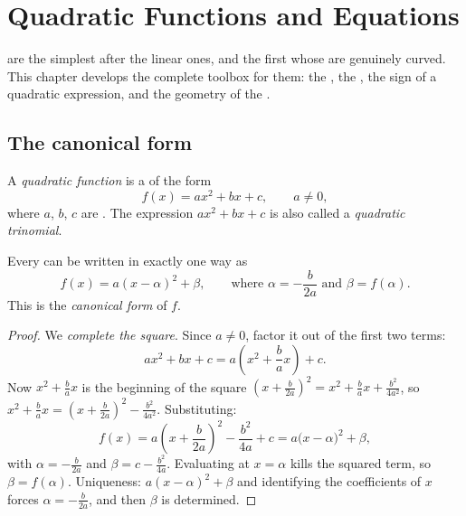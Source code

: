 \chapter{Quadratic Functions and Equations}\label{ch:g11:quad}

 are the simplest  after the linear ones, and
the first whose  are genuinely curved. This chapter develops the
complete toolbox for them: the , the , the sign
of a quadratic expression, and the geometry of the .

\section{The canonical form}

\begin{definition}\label{def:g11:quad:quadratic}
A \emph{quadratic function} is a  of the
form
\[
f(x) = ax^2 + bx + c, \qquad a \neq 0,
\]
where $a$, $b$, $c$ are . The expression $ax^2 + bx + c$ is
also called a \emph{quadratic trinomial}.
\end{definition}

\begin{theorem}\label{thm:g11:quad:canonical}
Every  can be written in exactly one way as
\[
f(x) = a(x - \alpha)^2 + \beta,
\qquad\text{where } \alpha = -\frac{b}{2a} \text{ and } \beta = f(\alpha).
\]
This is the \emph{canonical form} of $f$.
\end{theorem}

\begin{proof}
We \emph{complete the square}. Since $a \neq 0$, factor it out of the first
two terms:
\[
ax^2 + bx + c = a\left(x^2 + \frac{b}{a}x\right) + c .
\]
Now $x^2 + \frac{b}{a}x$ is the beginning of the square
$\left(x + \frac{b}{2a}\right)^2 = x^2 + \frac ba x + \frac{b^2}{4a^2}$,
so $x^2 + \frac{b}{a}x = \left(x + \frac{b}{2a}\right)^2 -
\frac{b^2}{4a^2}$. Substituting:
\[
f(x) = a\left(x + \frac{b}{2a}\right)^2 - \frac{b^2}{4a} + c
= a\bigl(x - \alpha\bigr)^2 + \beta,
\]
with $\alpha = -\frac{b}{2a}$ and $\beta = c - \frac{b^2}{4a}$. Evaluating
at $x = \alpha$ kills the squared term, so $\beta = f(\alpha)$. Uniqueness:
 $a(x-\alpha)^2 + \beta$ and identifying the coefficients of $x$
forces $\alpha = -\frac{b}{2a}$, and then $\beta$ is determined.
\end{proof}

